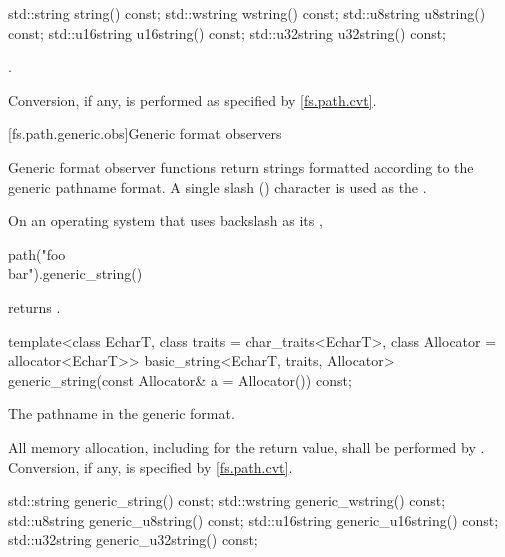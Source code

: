%
%
%
%
%
\begin{itemdecl}
std::string string() const;
std::wstring wstring() const;
std::u8string u8string() const;
std::u16string u16string() const;
std::u32string u32string() const;
\end{itemdecl}

\begin{itemdescr}
\pnum
\returns
{}.

\pnum
\remarks
Conversion, if any, is performed as specified
by \ref{fs.path.cvt}.
\end{itemdescr}


[fs.path.generic.obs]{Generic format observers}

\pnum
Generic format observer functions return strings formatted according to the
generic pathname format.
A single slash () character is used as
the .

\pnum
\begin{example}
On an operating system that uses backslash as
its ,
\begin{codeblock}
path("foo\\bar").generic_string()
\end{codeblock}
returns .
\end{example}

%
\begin{itemdecl}
template<class EcharT, class traits = char_traits<EcharT>,
         class Allocator = allocator<EcharT>>
  basic_string<EcharT, traits, Allocator>
    generic_string(const Allocator& a = Allocator()) const;
\end{itemdecl}

\begin{itemdescr}
\pnum
\returns
The pathname in the generic format.

\pnum
\remarks
All memory allocation, including for the return value, shall
be performed by . Conversion, if any, is specified by
\ref{fs.path.cvt}.
\end{itemdescr}

%
%
%
%
%
\begin{itemdecl}
std::string generic_string() const;
std::wstring generic_wstring() const;
std::u8string generic_u8string() const;
std::u16string generic_u16string() const;
std::u32string generic_u32string() const;
\end{itemdecl}

